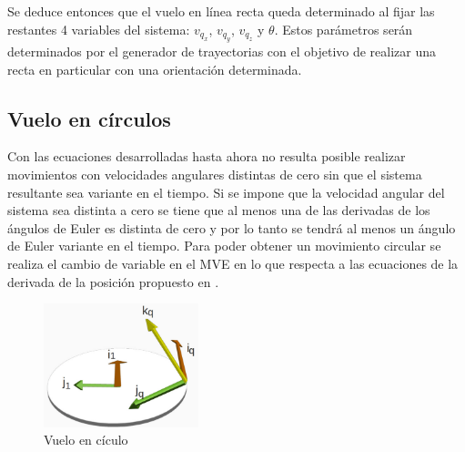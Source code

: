\documentclass[main]{subfiles}
\begin{document}
Se deduce entonces que el vuelo en l\'inea recta queda determinado al fijar las restantes 4 variables del sistema: $v_{q_x}$, $v_{q_y}$, $v_{q_z}$ y $\theta$. Estos par\'ametros ser\'an determinados por el generador de trayectorias con el objetivo de realizar una recta en particular con una orientaci\'on determinada. 

\subsection{Vuelo en c\'irculos}

Con las ecuaciones desarrolladas hasta ahora no resulta posible realizar movimientos con velocidades angulares distintas de cero sin que el sistema resultante sea variante en el tiempo. Si se impone que la velocidad angular del sistema sea distinta a cero se tiene que al menos una de las derivadas de los \'angulos de Euler es distinta de cero y por lo tanto se tendr\'a al menos un \'angulo de Euler variante en el tiempo. Para poder obtener un movimiento circular se realiza el cambio de variable en el MVE en lo que respecta a las ecuaciones de la derivada de la posici\'on propuesto en \cite{bib:auion}. \\

\begin{figure}
  \begin{center}
  \vspace{-10pt}
    \includegraphics[width=0.40\textwidth]{./pics_linealizacion/circulo.pdf}
  \end{center}
  \caption{Vuelo en c\'iculo}
  \label{fig:circulo}
\end{figure}
\end{document}
